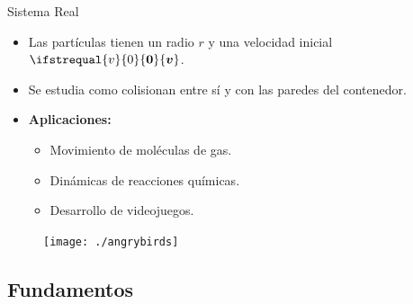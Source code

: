 \documentclass{beamer}
\renewcommand\vec[1]{\ifstrequal{#1}{0}{\ensuremath{\mathbf{0}}}{\ensuremath{\boldsymbol{#1}}}}
\begin{document}
            \begin{frame}{Sistema Real}
                \begin{itemize}
                    \item Las partículas tienen un radio $r$ y una velocidad inicial $\vec{v}$.
                    \item Se estudia como colisionan entre sí y con las paredes del contenedor.
                \end{itemize}
                \begin{minipage}[t]{0.5\textwidth}
                    \begin{itemize}
                        \item \textbf{Aplicaciones:}
                        \begin{itemize}
                            \item Movimiento de moléculas de gas.
                            \item Dinámicas de reacciones químicas.
                            \item Desarrollo de videojuegos.
                        \end{itemize}
                    \end{itemize}
                \end{minipage}
                \hfill
                \begin{minipage}[t]{0.45\textwidth}
                    \begin{figure}[H]
                        \centering
                        \texttt{[image: ./angrybirds]}
                        \label{fig:angry_birds}
                    \end{figure}
                \end{minipage}
            \end{frame}

        \subsection{Fundamentos}
\end{document}
